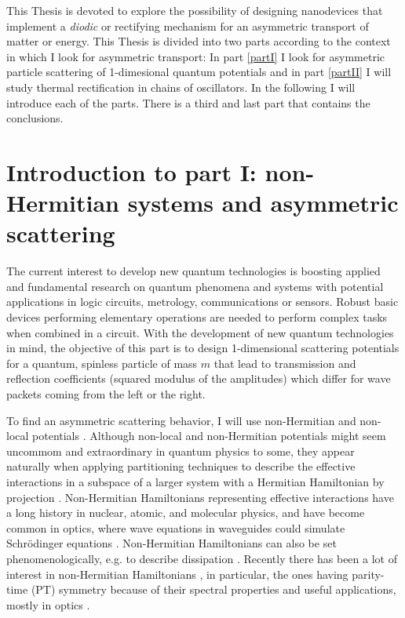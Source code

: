 This Thesis is devoted to explore the possibility of designing nanodevices that implement a \textit{diodic} or rectifying mechanism for an asymmetric transport of matter or energy. This Thesis
is divided into two parts according to the context in which I look for asymmetric transport: In part \ref{partI} I look for asymmetric particle scattering of 1-dimesional quantum potentials and in part \ref{partII} I will study thermal rectification in chains of oscillators. In the following I will introduce each of the parts. There is a third and last part that contains the conclusions.


\section*{Introduction to part I: non-Hermitian systems and asymmetric scattering}

The current interest to develop new quantum technologies is boosting applied
and fundamental research on quantum phenomena and systems with potential
applications in logic circuits, metrology, communications or sensors. Robust basic devices performing elementary operations are needed to perform complex tasks when combined in a circuit. With the development of new quantum technologies in mind, the objective of this part is to design 1-dimensional scattering potentials for a quantum, spinless particle of mass $m$ that lead to transmission and reflection coefficients (squared modulus of the amplitudes) which differ for wave packets coming from the left or the right.

To find an asymmetric scattering behavior, I will use non-Hermitian and non-local potentials \cite{Muga2004,Mostafazadeh2018}. Although non-local and non-Hermitian potentials might seem uncommom and extraordinary in quantum physics to some, they appear naturally when applying partitioning techniques to describe the effective interactions in a subspace of a larger system with a Hermitian Hamiltonian by projection \cite{Feshbach1958,Ruschhaupt2004,Muga2004}. Non-Hermitian Hamiltonians representing effective interactions have a long history in nuclear, atomic, and molecular physics, and have become common in optics, where wave equations in waveguides could simulate  Schr\"odinger equations \cite{Ruschhaupt2005,Longhi2017a,Konotop2016}. Non-Hermitian Hamiltonians can also be set phenomenologically, e.g. to describe dissipation \cite{Ruschhaupt2005}. Recently there has been a lot of interest in non-Hermitian Hamiltonians \cite{Nixon2016,Nixon2016a,Chen2017,Ruschhaupt2017,Simon2018,Simon2019a,Alana2020,Bernard2002,Kawabata2019}, in particular, the ones having parity-time (PT) symmetry \cite{Bender1998,Znojil2015} because of their spectral properties and useful applications, mostly in optics  \cite{Longhi2017a,Konotop2016,Longhi2014}.

